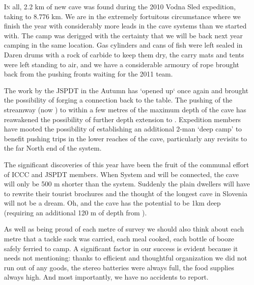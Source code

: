 \thispagestyle{endchapter}

\begin{tcolorbox}
\vspace{80pt}

\lettrine{I}{n} all, 2.2 km of new cave was found during the 2010 Vodna Sled expedition, taking  to 8.776 km. We are in the extremely fortuitous circumstance where we finish the year with considerably more leads in the  cave systems
than we started with. The  camp was derigged with the certainty that we will be back next year camping in the same location. Gas cylinders and cans of fish were left sealed in Daren drums with
a rock of carbide to keep them dry, the carry mats and tents were left standing to air, and we have a considerable armoury of rope brought back from the pushing fronts waiting for the 2011 team.

The work by the JSPDT in the Autumn has ‘opened up‘  once again and brought the possibility of forging a connection back to the table. The pushing of the  streamway (now ) to within
a few metres of the maximum depth of the cave has reawakened the possibility of further depth extension to . Expedition members have mooted the possibility of establishing an additional 2-man
‘deep camp’ to benefit pushing trips in the lower reaches of the cave, particularly any revisits to the far North end of the system.

The significant discoveries of this year have been the fruit of the communal effort of ICCC and JSPDT members. When System  and  will be connected, the cave will only be 500 m shorter than the
 system. Suddenly the plain dwellers will have to rewrite their tourist brochures and the thought of the longest cave in Slovenia will not be a dream. Oh, and the cave has the potential to be 1km
deep (requiring an additional 120 m of depth from ).

As well as being proud of each metre of survey we should also think about each metre that a tackle sack was carried, each meal cooked, each bottle of booze safely ferried to camp. A significant factor in our success is evident because it needs not mentioning: thanks to efficient and thoughtful organization we did not run out of any goods, the stereo batteries were always full, the food supplies always high. And most importantly, we have no accidents to report.

\end{tcolorbox}

